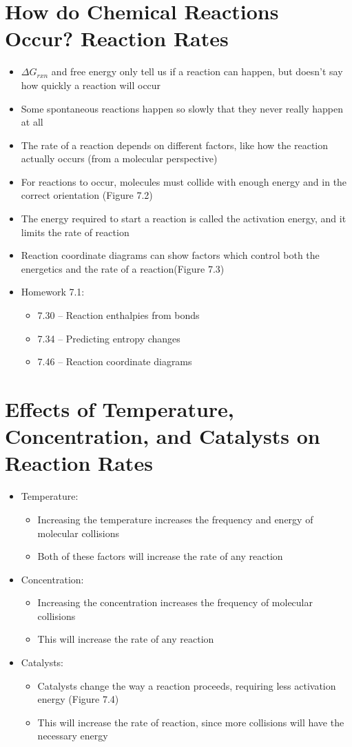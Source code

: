 \documentclass[12pt, openany, letterpaper]{memoir}
\begin{document}
\section{How do Chemical Reactions Occur? Reaction Rates}
\begin{itemize}
	\item $\Delta G_{rxn}$ and free energy only tell us if a reaction can happen, but doesn't say how quickly a reaction will occur
	\item Some spontaneous reactions happen so slowly that they never really happen at all
	\item The rate of a reaction depends on different factors, like how the reaction actually occurs (from a molecular perspective)
	\item For reactions to occur, molecules must collide with enough energy and in the correct orientation (Figure 7.2)
	\item The energy required to start a reaction is called the activation energy, and it limits the rate of reaction
	\item Reaction coordinate diagrams can show factors which control both the energetics and the rate of a reaction(Figure 7.3)
	\item Homework 7.1:
	\begin{itemize}
		\item 7.30 -- Reaction enthalpies from bonds
		\item 7.34 -- Predicting entropy changes
		\item 7.46 -- Reaction coordinate diagrams
	\end{itemize}
\end{itemize}
\section{Effects of Temperature, Concentration, and Catalysts on Reaction Rates}
\begin{itemize}
	\item Temperature:
	\begin{itemize}
		\item Increasing the temperature increases the frequency and energy of molecular collisions
		\item Both of these factors will increase the rate of any reaction
	\end{itemize}
	\item Concentration:
	\begin{itemize}
		\item Increasing the concentration increases the frequency of molecular collisions
		\item This will increase the rate of any reaction
	\end{itemize}
	\item Catalysts:
	\begin{itemize}
		\item Catalysts change the way a reaction proceeds, requiring less activation energy (Figure 7.4)
		\item This will increase the rate of reaction, since more collisions will have the necessary energy
	\end{itemize}
\end{itemize}
\end{document}

